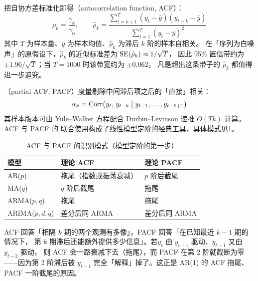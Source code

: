 把自协方差标准化即得（autocorrelation function, ACF）：
\begin{equation}\label{eq:09-acf}
  \rho_k=\frac{\gamma_k}{\gamma_0},\qquad
  \hat{\rho}_k=\frac{\sum_{t=k+1}^{T}(y_t-\bar{y})(y_{t-k}-\bar{y})}
                       {\sum_{t=1}^{T}(y_t-\bar{y})^2}
\end{equation}
其中 $T$ 为样本量、$\bar{y}$ 为样本均值、$\hat{\rho}_k$ 为滞后 $k$ 阶的样本自相关。
在「序列为白噪声」的原假设下，$\hat{\rho}_k$ 的近似标准差为 $\operatorname{SE}(\hat\rho_k)\approx 1/\sqrt{T}$，
因此 95\% 置信带约为 $\pm 1.96/\sqrt{T}$；当 $T=1000$ 时该带宽约为 $\pm 0.062$，
凡是超出这条带子的 $\hat\rho_k$ 都值得进一步追究。

（partial ACF, PACF）度量剔除中间滞后项之后的「直接」相关：
\begin{equation}\label{eq:09-pacf}
  \alpha_k=\operatorname{Corr}\bigl(y_t,\,y_{t-k}\;\big|\;y_{t-1},\dots,y_{t-k+1}\bigr)
\end{equation}
其样本版本可由 Yule--Walker 方程配合 Durbin--Levinson 递推 $O(Tk)$ 计算。ACF 与 PACF 的
联合使用构成了线性模型定阶的经典工具，具体模式见\cref{tab:09-identify}。

\begin{table}[htbp]
\centering
\caption{ACF 与 PACF 的识别模式（模型定阶的第一步）}\label{tab:09-identify}
\tablefont
\begin{tabular}{@{}lll@{}}
\toprule
模型 & 理论 ACF & 理论 PACF \\
\midrule
AR($p$) & 拖尾（指数或振荡衰减） & $p$ 阶后截尾 \\
MA($q$) & $q$ 阶后截尾 & 拖尾 \\
ARMA($p,q$) & 拖尾 & 拖尾 \\
ARIMA($p,d,q$) & 差分后同 ARMA & 差分后同 ARMA \\
\bottomrule
\end{tabular}
\end{table}

\begin{intuitionbox}
ACF 回答「相隔 $k$ 期的两个观测有多像」，PACF 回答「在已知最近 $k-1$ 期的情况下，
第 $k$ 期滞后还能额外提供多少信息」。若$y_t$ 由 $y_{t-1}$ 驱动、$y_{t-1}$ 又由 $y_{t-2}$ 驱动，
则 ACF 会一路衰减下去（拖尾），而 PACF 在第 2 阶就截断为零——因为第 2 阶滞后被 $y_{t-1}$
完全「解释」掉了。这正是 AR(1) 的 ACF 拖尾、PACF 一阶截尾的原因。
\end{intuitionbox}

